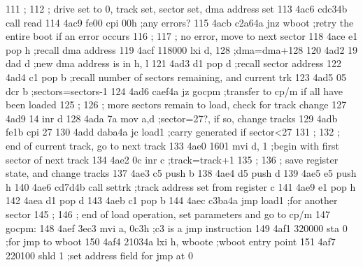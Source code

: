 111                       ;
112                       ;        drive set to 0, track set, sector set, dma address set
113      4ac6 cdc34b               call   read
114      4ac9 fe00                 cpi    00h            ;any errors?
115      4acb c2a64a               jnz    wboot          ;retry the entire boot if an error occurs
116                       ;
117                       ;        no error, move to next sector
118      4ace e1                   pop    h              ;recall dma address
119      4acf 118000               lxi    d, 128         ;dma=dma+128
120      4ad2 19                   dad    d              ;new dma address is in h, l
121      4ad3 d1                   pop    d              ;recall sector address
122      4ad4 c1                   pop    b              ;recall number of sectors remaining, and current trk
123      4ad5 05                   dcr    b              ;sectors=sectors-1
124      4ad6 caef4a               jz     gocpm          ;transfer to cp/m if all have been loaded
125                       ;
126                       ;        more sectors remain to load, check for track change
127      4ad9 14                   inr    d
128      4ada 7a                   mov    a,d            ;sector=27?, if so, change tracks
129      4adb fe1b                 cpi    27
130      4add daba4a               jc     load1          ;carry generated if sector<27
131                       ;
132                       ;        end of current track, go to next track
133      4ae0 1601                 mvi    d, 1           ;begin with first sector of next track
134      4ae2 0c                   inr    c              ;track=track+1
135                       ;
136                       ;        save register state, and change tracks
137      4ae3 c5                   push   b
138      4ae4 d5                   push   d
139      4ae5 e5                   push   h
140      4ae6 cd7d4b               call   settrk         ;track address set from register c
141      4ae9 e1                   pop    h
142      4aea d1                   pop    d
143      4aeb c1                   pop    b
144      4aec c3ba4a               jmp    load1          ;for another sector
145                       ;
146                       ;        end of load operation, set parameters and go to cp/m
147                       gocpm:
148      4aef 3ec3                 mvi    a, 0c3h        ;c3 is a jmp instruction
149      4af1 320000               sta    0              ;for jmp to wboot
150      4af4 21034a               lxi    h, wboote      ;wboot entry point
151      4af7 220100               shld   1              ;set address field for jmp at 0
